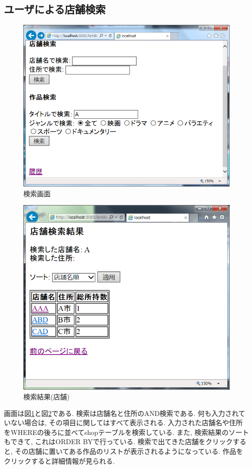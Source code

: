 \documentclass{jarticle}
\begin{document}
\subsection{ユーザによる店舗検索}
\begin{figure}[tp]
\begin{center}
\includegraphics[scale=0.5]{search.png}
\end{center}
\caption{検索画面}
\label{fig:search}
\end{figure}
\begin{figure}[tp]
\begin{center}
\includegraphics[scale=0.5]{result_shop.png}
\end{center}
\caption{検索結果(店舗)}
\label{fig:result_shop}
\end{figure}
画面は図\ref{fig:search}と図\ref{fig:result_shop}である. 検索は店舗名と住所のAND検索である. 何も入力されていない場合は, その項目に関してはすべて表示される. 入力された店舗名や住所をWHEREの後ろに並べてshopテーブルを検索している. また, 検索結果のソートもできて, これはORDER BYで行っている. 検索で出てきた店舗をクリックすると, その店舗に置いてある作品のリストが表示されるようになっている. 作品をクリックすると詳細情報が見られる.
\end{document}
